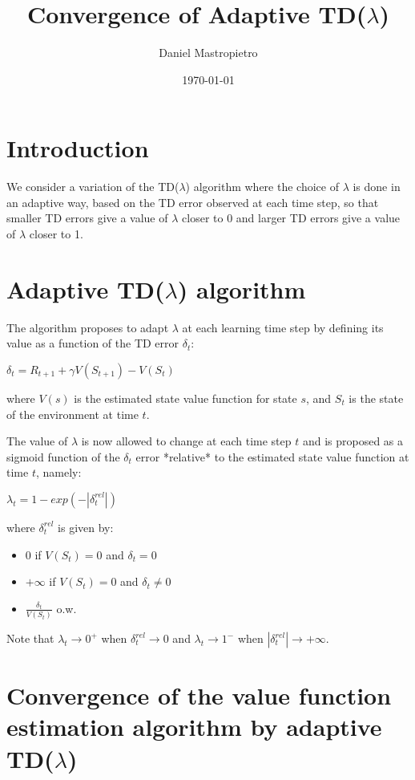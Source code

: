 \documentclass[11pt,A4paper]{article}
\author{Daniel Mastropietro}
\title{Convergence of Adaptive TD($\lambda$)}
\date{\today}
\begin{document}
\maketitle

\section{Introduction}

We consider a variation of the TD($\lambda$) algorithm where the choice of $\lambda$ is done in an adaptive way, based on the TD error observed at each time step, so that smaller TD errors give a value of $\lambda$ closer to 0 and larger TD errors give a value of $\lambda$ closer to 1.


\section{Adaptive TD($\lambda$) algorithm}

The algorithm proposes to adapt $\lambda$ at each learning time step by defining its value as a function of the TD error $\delta_t$:  

\medskip
$\delta_t = R_{t+1} + \gamma V(S_{t+1}) - V(S_t)$
\medskip

where $V(s)$ is the estimated state value function for state $s$, and $S_t$ is the state of the environment at time $t$.

The value of $\lambda$ is now allowed to change at each time step $t$ and is proposed as a sigmoid function of the $\delta_t$ error *relative* to the estimated state value function at time $t$, namely:  

\medskip
$\lambda_t = 1 - exp(- |\delta^{rel}_t| )$  
\medskip

where $\delta^{rel}_t$ is given by:  

\begin{itemize}
\item $0$ if $V(S_t) = 0$ and $\delta_t = 0$  
\item $+\infty$ if $V(S_t) = 0$ and $\delta_t \neq 0$  
\item $\frac{\delta_t}{V(S_t)}$ o.w.  
\end{itemize}

Note that $\lambda_t \to 0^+$ when $\delta^{rel}_t \to 0$ and $\lambda_t \to 1^-$ when $|\delta^{rel}_t| \to +\infty$.

\section{Convergence of the value function estimation algorithm by adaptive TD($\lambda$)}
\end{document}
